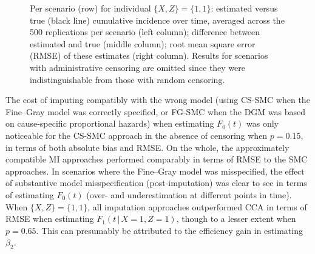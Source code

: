 \documentclass[
  letterpaper,
  paper=240mm:170mm,
  twoside=true,
  open=right,
  fontsize=10pt,
  pagesize=false,
  BCOR=15mm,
  DIV=14,
  headinclude=true,
  footinclude=false,
  headsepline=on]{scrbook}
\newcommand{\given}{\,|\,}
\begin{document}
\begin{figure}


\caption{\label{fig-preds-X1Z1}Per scenario (row) for individual
\(\{X,Z\} = \{1,1\}\): estimated versus true (black line) cumulative
incidence over time, averaged across the 500 replications per scenario
(left column); difference between estimated and true (middle column);
root mean square error (RMSE) of these estimates (right column). Results
for scenarios with administrative censoring are omitted since they were
indistinguishable from those with random censoring.}

\end{figure}%

The cost of imputing compatibly with the wrong model (using CS-SMC when
the Fine--Gray model was correctly specified, or FG-SMC when the DGM was
based on cause-specific proportional hazards) when estimating \(F_0(t)\)
was only noticeable for the CS-SMC approach in the absence of censoring
when \(p = 0.15\), in terms of both absolute bias and RMSE. On the
whole, the approximately compatible MI approaches performed comparably
in terms of RMSE to the SMC approaches. In scenarios where the
Fine--Gray model was misspecified, the effect of substantive model
misspecification (post-imputation) was clear to see in terms of
estimating \(F_0(t)\) (over- and underestimation at different points in
time). When \(\{X, Z\} = \{1, 1\}\), all imputation approaches
outperformed CCA in terms of RMSE when estimating
\(F_1(t \given X = 1, Z =1)\), though to a lesser extent when
\(p = 0.65\). This can presumably be attributed to the efficiency gain
in estimating \(\beta_2\).
\end{document}
